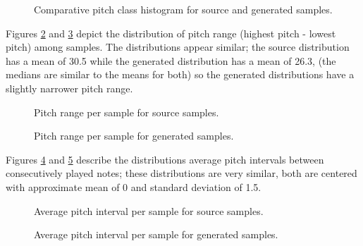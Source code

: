 \documentclass[sigconf,authorversion]{acmart}
\begin{document}
\begin{figure}[htbp]
    \begin{center}
        \scalebox{0.6}{}
    \end{center}
    \caption{Comparative pitch class histogram for source and generated samples.}
    \label{pch}
\end{figure}

Figures \ref{source_ranges} and \ref{generated_ranges} depict the
distribution of pitch range (highest pitch - lowest pitch) among
samples. The distributions appear similar; the source distribution has
a mean of 30.5 while the generated distribution has a mean of 26.3,
(the medians are similar to the means for both) so the generated
distributions have a slightly narrower pitch range.

\begin{figure}[htbp]
    \begin{center}
        \scalebox{0.6}{}
    \end{center}
    \caption{Pitch range per sample for source samples.}
    \label{source_ranges}
\end{figure}

\begin{figure}[htbp]
    \begin{center}
        \scalebox{0.6}{}
    \end{center}
    \caption{Pitch range per sample for generated samples.}
    \label{generated_ranges}
\end{figure}

Figures \ref{source_interval} and \ref{generated_interval} describe
the distributions average pitch intervals between consecutively played
notes; these distributions are very similar, both are centered with
approximate mean of 0 and standard deviation of 1.5.

\begin{figure}[htbp]
    \begin{center}
        \scalebox{0.6}{}
    \end{center}
    \caption{Average pitch interval per sample for source samples.}
    \label{source_interval}
\end{figure}

\begin{figure}[htbp]
    \begin{center}
        \scalebox{0.6}{}
    \end{center}
    \caption{Average pitch interval per sample for generated samples.}
    \label{generated_interval}
\end{figure}
\end{document}
